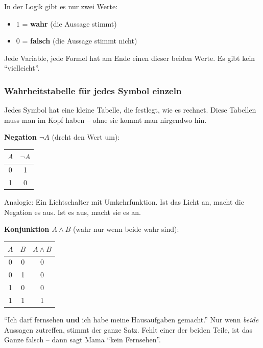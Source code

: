 \documentclass[a4paper,12pt]{article}
\begin{document}
\begin{merkbox}
In der Logik gibt es nur zwei Werte:
\begin{itemize}[nosep]
\item $1$ = \textbf{wahr} (die Aussage stimmt)
\item $0$ = \textbf{falsch} (die Aussage stimmt nicht)
\end{itemize}
Jede Variable, jede Formel hat am Ende einen dieser beiden Werte.
Es gibt kein "`vielleicht"'.
\end{merkbox}

\subsubsection*{Wahrheitstabelle f\"ur jedes Symbol einzeln}

Jedes Symbol hat eine kleine Tabelle, die festlegt, wie es rechnet.
Diese Tabellen muss man im Kopf haben -- ohne sie kommt man nirgendwo
hin.

\textbf{Negation $\neg A$} (dreht den Wert um):

\begin{center}
\renewcommand{\arraystretch}{1.2}
\begin{tabular}{c|c}
\toprule
$A$ & $\neg A$ \\
\midrule
0 & 1 \\
1 & 0 \\
\bottomrule
\end{tabular}
\end{center}

Analogie: Ein Lichtschalter mit Umkehrfunktion. Ist das Licht an,
macht die Negation es aus. Ist es aus, macht sie es an.

\textbf{Konjunktion $A \wedge B$} (wahr nur wenn beide wahr sind):

\begin{center}
\renewcommand{\arraystretch}{1.2}
\begin{tabular}{cc|c}
\toprule
$A$ & $B$ & $A \wedge B$ \\
\midrule
0 & 0 & 0 \\
0 & 1 & 0 \\
1 & 0 & 0 \\
1 & 1 & 1 \\
\bottomrule
\end{tabular}
\end{center}

\begin{analogie}
"`Ich darf fernsehen \textbf{und} ich habe meine Hausaufgaben
gemacht."' Nur wenn \emph{beide} Aussagen zutreffen, stimmt der ganze
Satz. Fehlt einer der beiden Teile, ist das Ganze falsch -- dann sagt
Mama "`kein Fernsehen"'.
\end{analogie}
\end{document}
